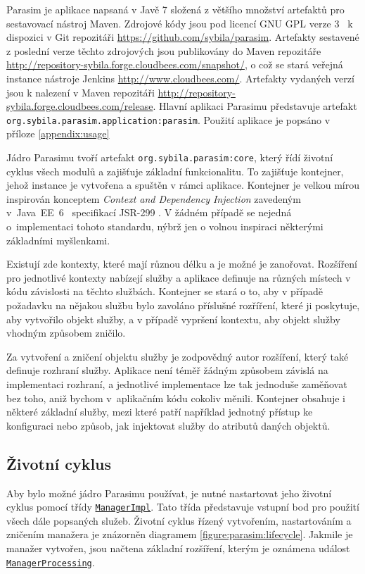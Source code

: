 Parasim je aplikace napsaná v Javě 7 složená z většího množství artefaktů pro
sestavovací nástroj Maven. Zdrojové kódy jsou pod licencí GNU GPL verze 3~\cite{gpl} k dispozici
v Git \cite{chacon2009} repozitáři \url{https://github.com/sybila/parasim}. Artefakty sestavené
z poslední verze těchto zdrojových jsou publikovány do Maven repozitáře
\url{http://repository-sybila.forge.cloudbees.com/snapshot/}, o což se stará veřejná
instance nástroje Jenkins \cite{jenkins} \url{http://www.cloudbees.com/}. Artefakty
vydaných verzí jsou k nalezení v Maven repozitáři \url{http://repository-sybila.forge.cloudbees.com/release}.
Hlavní aplikaci Parasimu představuje artefakt \texttt{org.sybila.parasim.application:parasim}.
Pou\-ži\-tí aplikace je popsáno v příloze \ref{appendix:usage}

Jádro Parasimu tvoří artefakt \texttt{org.sybila.parasim:core}, který řídí ži\-vot\-ní
cyklus všech modulů a zajišťuje základní funkcionalitu. To zajišťuje kontejner,
jehož instance je vytvořena a spuštěn v rámci aplikace. Kontejner je velkou mírou inspi\-ro\-ván
konceptem \textit{Context and Dependency Injection} zavedeným v~Java~EE~6~\cite{jendrock2010} specifikací
JSR-299 \cite{jsr299}. V žádném případě se nejedná o~implementaci tohoto standardu,
nýbrž jen o volnou inspiraci některými zá\-klad\-ní\-mi myšlenkami.

Existují zde kontexty, které mají různou délku a je možné je za\-no\-řo\-vat.
Rozšíření pro jednotlivé kontexty nabízejí služby a aplikace definuje na různých
místech v kódu závislosti na těchto službách. Kontejner se stará o to,
aby v případě požadavku na nějakou službu bylo zavoláno příslušné rozříření,
které ji poskytuje, aby vytvořilo objekt služby, a v případě vy\-pr\-še\-ní kontextu,
aby objekt služby vhodným způsobem zničilo.

Za vytvoření a zničení objektu služby je zodpovědný autor rozšíření, který také definuje rozhraní
služby. Aplikace není téměř žádným způsobem závislá na implementaci rozhraní,
a jednotlivé implementace lze tak jednoduše zaměňovat bez toho, aniž bychom
v~aplikačním kódu cokoliv mě\-ni\-li. Kontejner obsahuje i některé základní služby,
mezi které patří například jednotný přístup ke konfiguraci nebo způsob, jak injektovat
služby do atributů daných objektů.

\subsection{Životní cyklus}

Aby bylo možné jádro Parasimu používat, je nutné nastartovat jeho životní cyklus pomocí třídy
\href{https://github.com/sybila/parasim/blob/master/core/src/main/java/org/sybila/parasim/core/impl/ManagerImpl.java}{\texttt{ManagerImpl}}.
Tato třída představuje vstupní bod pro použití všech dále popsaných služeb.
Životní cyklus řízený vytvořením, nastartováním a zničením manažera je
znázorněn diagramem \ref{figure:parasim:lifecycle}. Jakmile je manažer vytvořen,
jsou načtena zá\-klad\-ní rozšíření, kterým je oznámena událost \href{https://github.com/sybila/parasim/blob/master/core/src/main/java/org/sybila/parasim/core/event/ManagerProcessing.java}{\texttt{ManagerProcessing}}.

